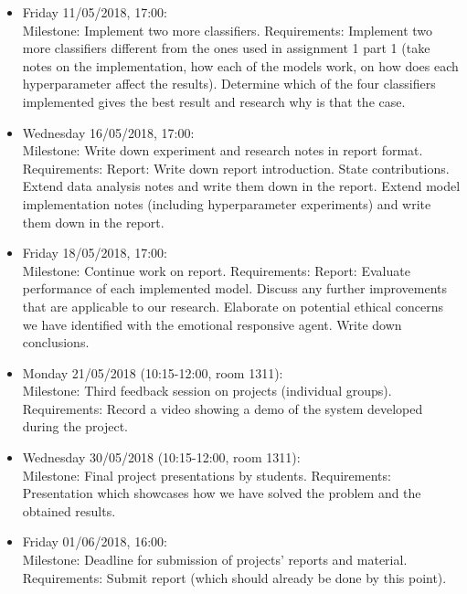 \begin{itemize}
\item Friday 11/05/2018, 17:00: \\
Milestone: Implement two more classifiers.
Requirements:
Implement two more classifiers different from the ones used in assignment 1 part 1 (take notes on the implementation, how each of the models work, on how does each hyperparameter affect the results).
Determine which of the four classifiers implemented gives the best result and research why is that the case.

\item Wednesday 16/05/2018, 17:00: \\
Milestone: Write down experiment and research notes in report format.
Requirements:
Report:
Write down report introduction.
State contributions.
Extend data analysis notes and write them down in the report.
Extend model implementation notes (including hyperparameter experiments) and write them down in the report.

\item Friday 18/05/2018, 17:00: \\
Milestone: Continue work on report.
Requirements:
Report:
Evaluate performance of each implemented model.
Discuss any further improvements that are applicable to our research.
Elaborate on potential ethical concerns we have identified with the emotional responsive agent.
Write down conclusions.

\item Monday 21/05/2018 (10:15-12:00, room 1311): \\
Milestone: Third feedback session on projects (individual groups).
Requirements:
Record a video showing a demo of the system developed during the project.

\item Wednesday 30/05/2018 (10:15-12:00, room 1311): \\
Milestone: Final project presentations by students.
Requirements:
Presentation which showcases how we have solved the problem and the obtained results.

\item Friday 01/06/2018, 16:00: \\
Milestone: Deadline for submission of projects’ reports and material.
Requirements:
Submit report (which should already be done by this point).
\end{itemize}
